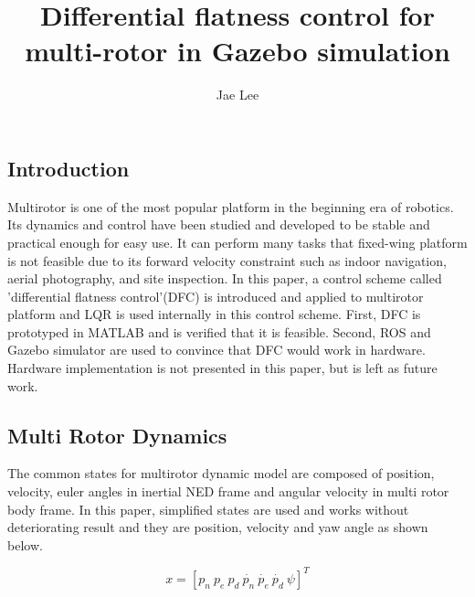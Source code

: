 \documentclass{article}
\author{Jae Lee}
\title{Differential flatness control for multi-rotor in Gazebo simulation}
\begin{document}
\maketitle

\subsection*{Introduction}
Multirotor is one of the most popular platform in the beginning era of robotics. Its dynamics and control have been studied and developed to be stable and practical enough for easy use. It can perform many tasks that fixed-wing platform is not feasible due to its forward velocity constraint such as indoor navigation, aerial photography, and site inspection. In this paper, a control scheme called 'differential flatness control'(DFC) is introduced and applied to multirotor platform and LQR is used internally in this control scheme. First, DFC is prototyped in MATLAB and is verified that it is feasible. Second, ROS and Gazebo simulator are used to convince that DFC would work in hardware. Hardware implementation is not presented in this paper, but is left as future work.

\subsection*{Multi Rotor Dynamics}
The common states for multirotor dynamic model are composed of position, velocity, euler angles in inertial NED frame and angular velocity in multi rotor body frame. In this paper, simplified states are used and works without deteriorating result and they are position, velocity and yaw angle as shown below.

\[x=[p_n\ p_e\ p_d\ \dot{p_n}\ \dot{p_e}\ \dot{p_d}\ \psi]^T \tag{1} \label{eq1}\]
\end{document}
